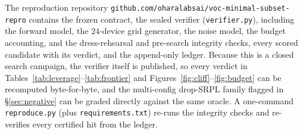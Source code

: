 \documentclass[11pt]{article}
\begin{document}
The reproduction repository \texttt{github.com/oharalabsai/voc-minimal-subset-repro} contains the frozen contract, the sealed verifier (\texttt{verifier.py}), including the forward model, the $24$-device grid generator, the noise model, the budget accounting, and the dress-rehearsal and pre-search integrity checks, every scored candidate with its verdict, and the append-only ledger. Because this is a closed search campaign, the verifier itself is published, so every verdict in Tables~\ref{tab:leverage}--\ref{tab:frontier} and Figures~\ref{fig:cliff}--\ref{fig:budget} can be recomputed byte-for-byte, and the multi-config drop-SRPL family flagged in \S\ref{sec:negative} can be graded directly against the same oracle. A one-command \texttt{reproduce.py} (plus \texttt{requirements.txt}) re-runs the integrity checks and re-verifies every certified hit from the ledger.



\end{document}
